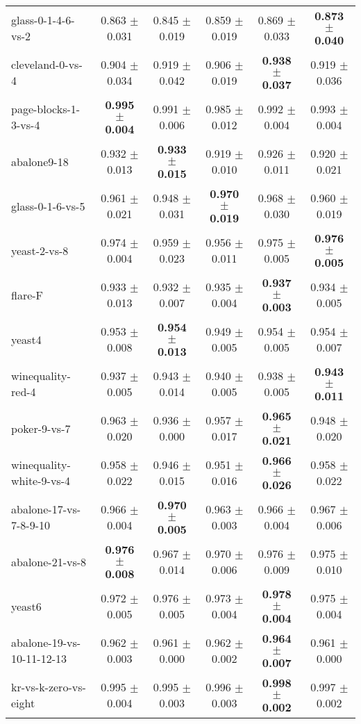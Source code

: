 \begin{table}[!ht]
{\begin{tabular}{l c c c c c}
glass-0-1-4-6-vs-2 & 0.863 $\pm$ 0.031 & 0.845 $\pm$ 0.019 & 0.859 $\pm$ 0.019 & 0.869 $\pm$ 0.033 & \textbf{0.873 $\pm$ 0.040} \\
cleveland-0-vs-4 & 0.904 $\pm$ 0.034 & 0.919 $\pm$ 0.042 & 0.906 $\pm$ 0.019 & \textbf{0.938 $\pm$ 0.037} & 0.919 $\pm$ 0.036 \\
page-blocks-1-3-vs-4 & \textbf{0.995 $\pm$ 0.004} & 0.991 $\pm$ 0.006 & 0.985 $\pm$ 0.012 & 0.992 $\pm$ 0.004 & 0.993 $\pm$ 0.004 \\
abalone9-18 & 0.932 $\pm$ 0.013 & \textbf{0.933 $\pm$ 0.015} & 0.919 $\pm$ 0.010 & 0.926 $\pm$ 0.011 & 0.920 $\pm$ 0.021 \\
glass-0-1-6-vs-5 & 0.961 $\pm$ 0.021 & 0.948 $\pm$ 0.031 & \textbf{0.970 $\pm$ 0.019} & 0.968 $\pm$ 0.030 & 0.960 $\pm$ 0.019 \\
yeast-2-vs-8 & 0.974 $\pm$ 0.004 & 0.959 $\pm$ 0.023 & 0.956 $\pm$ 0.011 & 0.975 $\pm$ 0.005 & \textbf{0.976 $\pm$ 0.005} \\
flare-F & 0.933 $\pm$ 0.013 & 0.932 $\pm$ 0.007 & 0.935 $\pm$ 0.004 & \textbf{0.937 $\pm$ 0.003} & 0.934 $\pm$ 0.005 \\
yeast4 & 0.953 $\pm$ 0.008 & \textbf{0.954 $\pm$ 0.013} & 0.949 $\pm$ 0.005 & 0.954 $\pm$ 0.005 & 0.954 $\pm$ 0.007 \\
winequality-red-4 & 0.937 $\pm$ 0.005 & 0.943 $\pm$ 0.014 & 0.940 $\pm$ 0.005 & 0.938 $\pm$ 0.005 & \textbf{0.943 $\pm$ 0.011} \\
poker-9-vs-7 & 0.963 $\pm$ 0.020 & 0.936 $\pm$ 0.000 & 0.957 $\pm$ 0.017 & \textbf{0.965 $\pm$ 0.021} & 0.948 $\pm$ 0.020 \\
winequality-white-9-vs-4 & 0.958 $\pm$ 0.022 & 0.946 $\pm$ 0.015 & 0.951 $\pm$ 0.016 & \textbf{0.966 $\pm$ 0.026} & 0.958 $\pm$ 0.022 \\
abalone-17-vs-7-8-9-10 & 0.966 $\pm$ 0.004 & \textbf{0.970 $\pm$ 0.005} & 0.963 $\pm$ 0.003 & 0.966 $\pm$ 0.004 & 0.967 $\pm$ 0.006 \\
abalone-21-vs-8 & \textbf{0.976 $\pm$ 0.008} & 0.967 $\pm$ 0.014 & 0.970 $\pm$ 0.006 & 0.976 $\pm$ 0.009 & 0.975 $\pm$ 0.010 \\
yeast6 & 0.972 $\pm$ 0.005 & 0.976 $\pm$ 0.005 & 0.973 $\pm$ 0.004 & \textbf{0.978 $\pm$ 0.004} & 0.975 $\pm$ 0.004 \\
abalone-19-vs-10-11-12-13 & 0.962 $\pm$ 0.003 & 0.961 $\pm$ 0.000 & 0.962 $\pm$ 0.002 & \textbf{0.964 $\pm$ 0.007} & 0.961 $\pm$ 0.000 \\
kr-vs-k-zero-vs-eight & 0.995 $\pm$ 0.004 & 0.995 $\pm$ 0.003 & 0.996 $\pm$ 0.003 & \textbf{0.998 $\pm$ 0.002} & 0.997 $\pm$ 0.002 \\

\end{tabular}}
\end{table}
